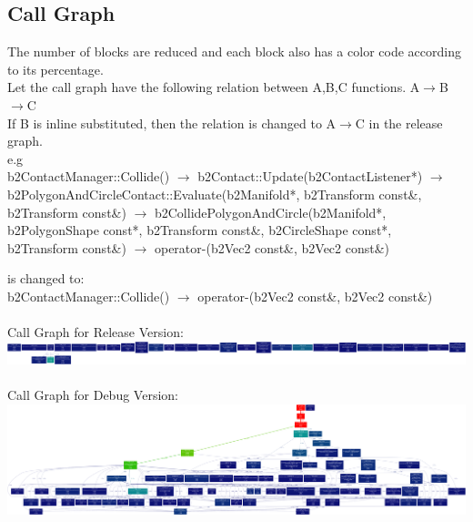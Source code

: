 \documentclass[11pt]{article}
\begin{document}
\subsection{Call Graph} 
The number of blocks are reduced and
each block also has a color code according to its percentage.\\
Let the call graph have the following relation between A,B,C functions. A$\rightarrow$B$\rightarrow$C \\
If B is inline substituted, then the relation is changed to A$\rightarrow$C in the release graph.\\
e.g \\
b2ContactManager::Collide()
$\rightarrow$
b2Contact::Update(b2ContactListener*)
$\rightarrow$
b2PolygonAndCircleContact::Evaluate(b2Manifold*, b2Transform const\&, b2Transform const\&)
$\rightarrow$
b2CollidePolygonAndCircle(b2Manifold*, b2PolygonShape const*, b2Transform const\&, b2CircleShape const*, b2Transform const\&)
$\rightarrow$
operator-(b2Vec2 const\&, b2Vec2 const\&)

is changed to:\\
b2ContactManager::Collide()
$\rightarrow$
operator-(b2Vec2 const\&, b2Vec2 const\&)\\ \\

Call Graph for Release Version:\\
\includegraphics[width=1.0\textwidth,keepaspectratio]{img/g08_release}\\ \\ 
Call Graph for Debug Version:\\
\includegraphics[width=1.0\textwidth,keepaspectratio]{img/g08_debug}

\end{document}
